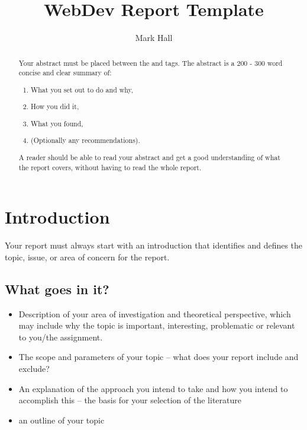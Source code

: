 \documentclass[a4paper,10pt]{ehu_webdev_report}
\title{WebDev Report Template} %
\author{Mark Hall}             %
\begin{document}
\maketitle

\begin{abstract}

Your abstract must be placed between the  and  tags. The abstract is a 200 - 300 word concise and clear summary of:

\begin{enumerate}
  \item What you set out to do and why,
  \item How you did it,
  \item What you found,
  \item (Optionally any recommendations).
\end{enumerate}

A reader should be able to read your abstract and get a good understanding of what the report covers, without having to read the whole report.

\end{abstract}

\section{Introduction}
\label{sec:introduction}

Your report must always start with an introduction that identifies and defines the topic, issue, or area of concern for the report. 

\subsection{What goes in it?}

\begin{itemize}
  \item Description of your area of investigation and theoretical perspective, which may include why the topic is important, interesting, problematic or relevant to you/the assignment.
  \item The scope and parameters of your topic -- what does your report include and exclude?
  \item An explanation of the approach you intend to take and how you intend to accomplish this -- the basis for your selection of the literature
  \item an outline of your topic
\end{itemize}
\end{document}

